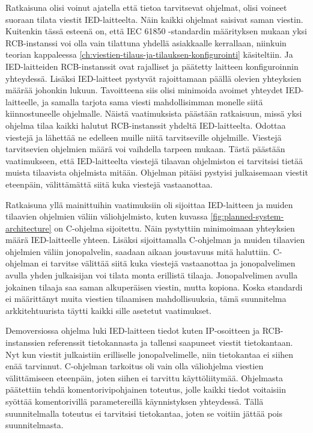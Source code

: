 Ratkaisuna olisi voinut ajatella että tietoa tarvitsevat ohjelmat, olisi voineet suoraan tilata viestit IED-laitteelta. Näin kaikki ohjelmat saisivat saman viestin. Kuitenkin tässä esteenä on, että IEC 61850 -standardin määrityksen mukaan yksi RCB-instanssi voi olla vain tilattuna yhdellä asiakkaalle kerrallaan, niinkuin teorian kappaleessa \ref{ch:viestien-tilaus-ja-tilauksen-konfigurointi} käsiteltiin. Ja IED-laitteiden RCB-instanssit ovat rajalliset ja päätetty laitteen konfiguroinnin yhteydessä. Lisäksi IED-laitteet pystyvät rajoittamaan päällä olevien yhteyksien määrää johonkin lukuun. Tavoitteena siis olisi minimoida avoimet yhteydet IED-laitteelle, ja samalla tarjota sama viesti mahdollisimman monelle siitä kiinnostuneelle ohjelmalle. Näistä vaatimuksista päästään ratkaisuun, missä yksi ohjelma tilaa kaikki halutut RCB-instanssit yhdeltä IED-laitteelta. Odottaa viestejä ja lähettää ne edelleen muille niitä tarvitseville ohjelmille. Viestejä tarvitsevien ohjelmien määrä voi vaihdella tarpeen mukaan. Tästä päästään vaatimukseen, että IED-laitteelta viestejä tilaavan ohjelmiston ei tarvitsisi tietää muista tilaavista ohjelmista mitään. Ohjelman pitäisi pystyisi julkaisemaan viestit eteenpäin, välittämättä siitä kuka viestejä vastaanottaa.

Ratkaisuna yllä mainittuihin vaatimuksiin oli sijoittaa IED-laitteen ja muiden tilaavien ohjelmien väliin väliohjelmisto, kuten kuvassa \ref{fig:planned-system-architecture} on C-ohjelma sijoitettu. Näin pystyttiin minimoimaan yhteyksien määrä IED-laitteelle yhteen. Lisäksi sijoittamalla C-ohjelman ja muiden tilaavien ohjelmien väliin jonopalvelin, saadaan aikaan joustavuus mitä haluttiin. C-ohjelman ei tarvitse välittää siitä kuka viestejä vastaanottaa ja jonopalvelimen avulla yhden julkaisijan voi tilata monta erillistä tilaaja. Jonopalvelimen avulla jokainen tilaaja saa saman alkuperäisen viestin, mutta kopiona. Koska standardi ei määrittänyt muita viestien tilaamisen mahdollisuuksia, tämä suunnitelma arkkitehtuurista täytti kaikki sille asetetut vaatimukset.

Demoversiossa ohjelma luki IED-laitteen tiedot kuten IP-osoitteen ja RCB-instanssien referenssit tietokannasta ja tallensi saapuneet viestit tietokantaan. Nyt kun viestit julkaistiin erilliselle jonopalvelimelle, niin tietokantaa ei siihen enää tarvinnut. C-ohjelman tarkoitus oli vain olla väliohjelma viestien välittämiseen eteenpäin, joten siihen ei tarvittu käyttöliitymää. Ohjelmasta päätettiin tehdä komentorivipohjainen toteutus, jolle kaikki tiedot voitaisiin syöttää komentorivillä parametereillä käynnistyksen yhteydessä. Tällä suunnitelmalla toteutus ei tarvitsisi tietokantaa, joten se voitiin jättää pois suunnitelmasta.


